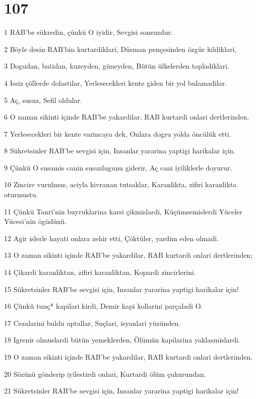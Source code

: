 \chapter{107}

\par 1 RAB'be sükredin, çünkü O iyidir, Sevgisi sonsuzdur.
\par 2 Böyle desin RAB'bin kurtardiklari, Düsman pençesinden özgür kildiklari,
\par 3 Dogudan, batidan, kuzeyden, güneyden, Bütün ülkelerden topladiklari.
\par 4 Issiz çöllerde dolastilar, Yerlesecekleri kente giden bir yol bulamadilar.
\par 5 Aç, susuz, Sefil oldular.
\par 6 O zaman sikinti içinde RAB'be yakardilar, RAB kurtardi onlari dertlerinden.
\par 7 Yerlesecekleri bir kente varincaya dek, Onlara dogru yolda öncülük etti.
\par 8 Sükretsinler RAB'be sevgisi için, Insanlar yararina yaptigi harikalar için.
\par 9 Çünkü O susamis canin susuzlugunu giderir, Aç cani iyiliklerle doyurur.
\par 10 Zincire vurulmus, aciyla kivranan tutsaklar, Karanlikta, zifiri karanlikta oturmustu.
\par 11 Çünkü Tanri'nin buyruklarina karsi çikmislardi, Küçümsemislerdi Yüceler Yücesi'nin ögüdünü.
\par 12 Agir islerle hayati onlara zehir etti, Çöktüler, yardim eden olmadi.
\par 13 O zaman sikinti içinde RAB'be yakardilar, RAB kurtardi onlari dertlerinden;
\par 14 Çikardi karanliktan, zifiri karanliktan, Kopardi zincirlerini.
\par 15 Sükretsinler RAB'be sevgisi için, Insanlar yararina yaptigi harikalar için!
\par 16 Çünkü tunç* kapilari kirdi, Demir kapi kollarini parçaladi O.
\par 17 Cezalarini buldu aptallar, Suçlari, isyanlari yüzünden.
\par 18 Igrenir olmuslardi bütün yemeklerden, Ölümün kapilarina yaklasmislardi.
\par 19 O zaman sikinti içinde RAB'be yakardilar, RAB kurtardi onlari dertlerinden.
\par 20 Sözünü gönderip iyilestirdi onlari, Kurtardi ölüm çukurundan.
\par 21 Sükretsinler RAB'be sevgisi için, Insanlar yararina yaptigi harikalar için!
